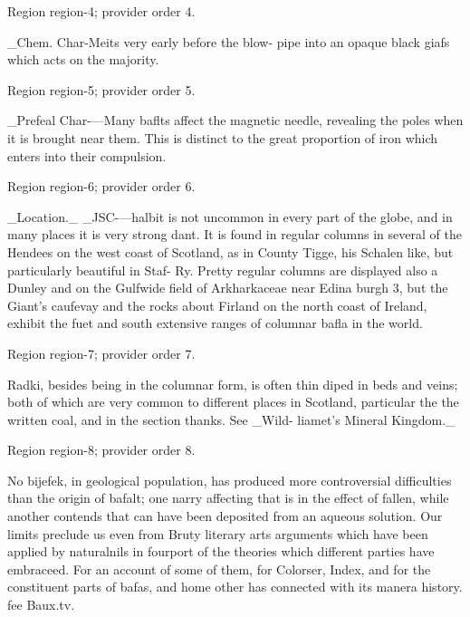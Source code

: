 \documentclass[11pt]{article}
\begin{document}
{\scriptsize\color{gray} Region region-4; provider order 4.\par}
\medskip

\_Chem. Char-Meits very early before the blow-
pipe into an opaque black giafs which acts on the
majority.
\par

{\scriptsize\color{gray} Region region-5; provider order 5.\par}
\medskip

\_Prefeal Char-—Many baflts affect the magnetic
needle, revealing the poles when it is brought near
them. This is distinct to the great proportion of iron
which enters into their compulsion.
\par

{\scriptsize\color{gray} Region region-6; provider order 6.\par}
\medskip

\_Location.\_ \_JSC-—halbit is not uncommon in every
part of the globe, and in many places it is very strong
dant. It is found in regular columns in several of the
Hendees on the west coast of Scotland, as in County
Tigge, his Schalen like, but particularly beautiful in Staf-
Ry. Pretty regular columns are displayed also a Dunley
and on the Gulfwide field of Arkharkaceae near Edina
burgh 3, but the Giant’s caufevay and the rocks about
Firland on the north coast of Ireland, exhibit the
fuet and south extensive ranges of columnar bafla in
the world.
\par

{\scriptsize\color{gray} Region region-7; provider order 7.\par}
\medskip

Radki, besides being in the columnar form, is often
thin diped in beds and veins; both of which are very
common to different places in Scotland, particular the
the written coal, and in the section thanks. See \_Wild-
liamet's Mineral Kingdom.\_
\par

{\scriptsize\color{gray} Region region-8; provider order 8.\par}
\medskip

No bijefek, in geological population, has produced
more controversial difficulties than the origin of bafalt;
one narry affecting that is in the effect of fallen, while
another contends that can have been deposited from
an aqueous solution. Our limits preclude us even from
Bruty literary arts arguments which have been applied
by naturalnils in fourport of the theories which different
parties have embraceed. For an account of some
of them, for Colorser, Index, and for the constituent
parts of bafas, and home other has connected with its
manera history. fee Baux.tv.
\par
\end{document}
